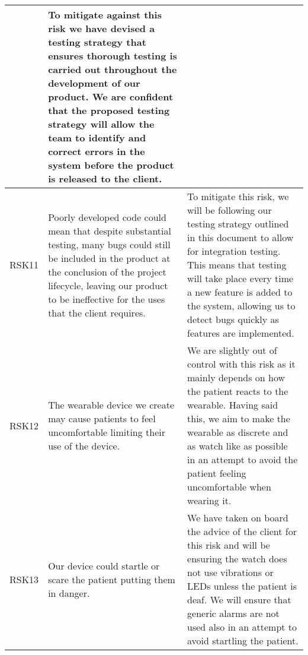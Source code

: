 \begin{xltabular}[H]{\textwidth}{c | X | X}
    &

    To mitigate against this risk we have devised a testing strategy that ensures thorough testing is carried out throughout the development of our product. We are confident that the proposed testing strategy will allow the team to identify and correct errors in the system before the product is released to the client.\\

    \midrule

    RSK11

    &

    Poorly developed code could mean that despite substantial testing, many bugs could still be included in the product at the conclusion of the project lifecycle, leaving our product to be ineffective for the uses that the client requires.

    &

    To mitigate this risk, we will be following our testing strategy outlined in this document to allow for integration testing. This means that testing will take place every time a new feature is added to the system, allowing us to detect bugs quickly as features are implemented.\\

    \midrule

    RSK12

    &

    The wearable device we create may cause patients to feel uncomfortable limiting their use of the device.

    &

    We are slightly out of control with this risk as it mainly depends on how the patient reacts to the wearable. Having said this, we aim to make the wearable as discrete and as watch like as possible in an attempt to avoid the patient feeling uncomfortable when wearing it.\\

    \midrule

    RSK13

    &

    Our device could startle or scare the patient putting them in danger.

    &

    We have taken on board the advice of the client for this risk and will be ensuring the watch does not use vibrations or LEDs unless the patient is deaf. We will ensure that generic alarms are not used also in an attempt to avoid startling the patient.\\


\end{xltabular}
